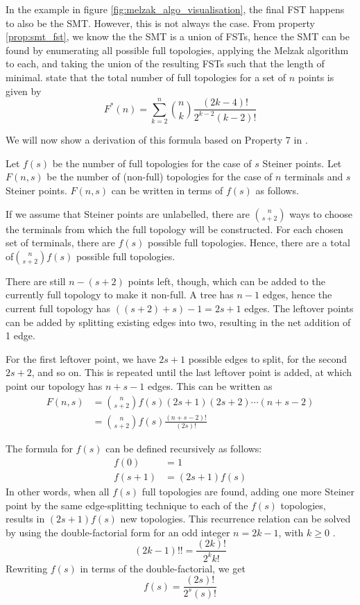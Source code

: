 \documentclass{l4proj}
\begin{document}
In the example in figure \ref{fig:melzak_algo_visualisation}, the final FST happens to also be the SMT. However, this is not always the case. From property \ref{prop:smt_fst}, we know the the SMT is a union of FSTs, hence the SMT can be found by enumerating all possible full topologies, applying the Melzak algorithm to each, and taking the union of the resulting FSTs such that the length of minimal. \cite{geosteiner96} state that the total number of full topologies for a set of $n$ points is given by
$$
    F^*(n) = \sum_{k=2}^{n} \binom{n}{k}\frac{(2k - 4)!}{2^{k-2}(k-2)!}
$$

We will now show a derivation of this formula based on Property 7 in \cite{Gilbert1968SteinerMT}.

Let $f(s)$ be the number of full topologies for the case of $s$ Steiner points.
Let $F(n, s)$ be the number of (non-full) topologies for the case of $n$ terminals and $s$ Steiner points. $F(n, s)$ can be written in terms of $f(s)$ as follows.

If we assume that Steiner points are unlabelled, there are $\binom{n}{s+2}$ ways to choose the terminals from which the full topology will be constructed. For each chosen set of terminals, there are $f(s)$ possible full topologies. Hence, there are a total of$\binom{n}{s+2}f(s)$ possible full topologies.

There are still $n - (s + 2)$ points left, though, which can be added to the currently full topology to make it non-full. A tree has $n - 1$ edges, hence the current full topology has $((s + 2) + s) - 1 = 2s + 1$ edges. The leftover points can be added by splitting existing edges into two, resulting in the net addition of 1 edge.

For the first leftover point, we have $2s + 1$ possible edges to split, for the second $2s + 2$, and so on. This is repeated until the last leftover point is added, at which point our topology has $n + s - 1$ edges. This can be written as
\begin{equation*}
    \begin{aligned}
        F(n, s) & = \binom{n}{s+2}f(s)(2s + 1)(2s + 2)\cdots(n + s - 2) \\
                & = \binom{n}{s+2}f(s)\frac{(n + s - 2)!}{(2s)!}
    \end{aligned}
\end{equation*}

The formula for $f(s)$ can be defined recursively as follows:
\begin{equation*}
    \begin{aligned}
        f(0)   & = 1            \\
        f(s+1) & = (2s + 1)f(s)
    \end{aligned}
\end{equation*}
In other words, when all $f(s)$ full topologies are found, adding one more Steiner point by the same edge-splitting technique to each of the $f(s)$ topologies, results in $(2s + 1)f(s)$ new topologies.
This recurrence relation can be solved by using the double-factorial form for an odd integer $n = 2k - 1$, with $k \ge 0$ \citep{Double_factorial}.
$$
    (2k - 1)!! = \frac{(2k)!}{2^k k!}
$$
Rewriting $f(s)$ in terms of the double-factorial, we get
$$
    f(s) = \frac{(2s)!}{2^{s}(s)!}
$$
\end{document}
